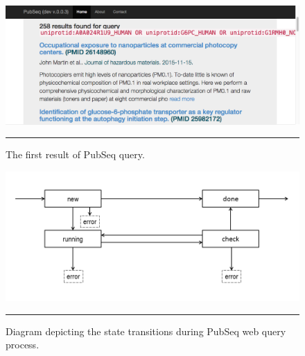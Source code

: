\begin{figure}[htbp]
    \includegraphics[width=6in]{Figures/pubseq_web_first_result.png}
    \rule{35em}{0.5pt}
  \caption[The first result of PubSeq query.]{The first result of PubSeq query.}
  \label{fig:PubSeqWebFirstResult}
\end{figure}

\begin{figure}[htbp]
    \includegraphics[width=6in]{Figures/pubseq_state_diagram.png}
    \rule{35em}{0.5pt}
  \caption[PubSeq web query state diagram.]{Diagram depicting the state transitions during PubSeq web query process.}
  \label{fig:PubSeqWebStates}
\end{figure}